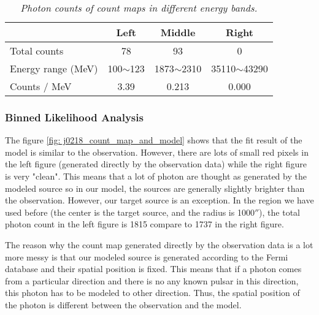 \documentclass[12pt]{report}
\newcommand{\mycaption}[1]{\caption{\textit{\footnotesize #1}}}
\begin{document}
          \begin{table}[!h]   
            \centering
            \begin{tabular}{m{4cm} | c | c | c }
              & Left & Middle & Right \\
              \hline
              Total counts & 78 & 93 & 0 \\
              \hline 
              Energy range (MeV) & 100$\sim$123 & 1873$\sim$2310 & 35110$\sim$43290 \\ 
              \hline
              Counts / MeV & 3.39 & 0.213 & 0.000 \\  
            \end{tabular}
            \mycaption{Photon counts of count maps in different energy bands.}
            \label{table:j0218_ccube_photon_counts}
          \end{table}

          \subsubsection{Binned Likelihood Analysis}

            The figure \ref{fig: j0218_count_map_and_model} shows that the fit result of the model 
            is similar to the observation. However, 
            there are lots of small red pixels in the left figure (generated directly by the observation data) while the 
            right figure is very "clean". This means that a lot of photon are thought as generated by the modeled 
            source so in our model, the sources are generally slightly brighter than the observation. However, our target
            source is an exception. In the region we have used before (the center is the target source, and the radius is
            1000$''$), the total photon count in the left figure is 1815 compare to 1737 in the right figure. 

            The reason why the count map generated directly by the observation data is a lot more messy is that our modeled 
            source is generated according to the Fermi database and their spatial position is fixed. This means that if 
            a photon comes from a particular direction and there is no any known pulsar in this direction, this 
            photon has to be modeled to other direction. Thus, the spatial position of the photon is different 
            between the observation and the model. 
            
\end{document}
